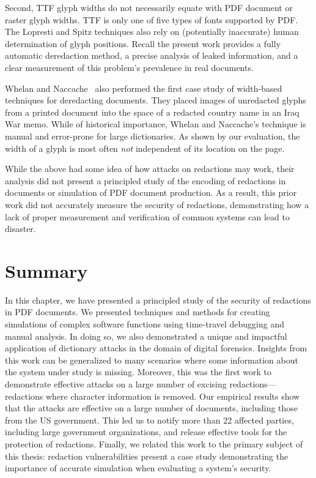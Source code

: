 Second, TTF glyph widths do not necessarily equate with PDF document or raster glyph widths.
TTF is only one of five types of fonts supported by PDF.
The Lopresti and Spitz techniques also rely on (potentially inaccurate) human determination of glyph positions.
Recall the present work provides a fully automatic deredaction method, a precise analysis of leaked information, and a clear measurement of this problem's prevalence in real documents.

Whelan and Naccache~\cite{egyptian} also performed the first case study of width-based techniques for deredacting documents.
They placed images of unredacted glyphs from a printed document into the space of a redacted country name in an Iraq War memo.
While of historical importance, Whelan and Naccache's technique is manual and error-prone for large dictionaries.
As shown by our evaluation, the width of a glyph is most often \emph{not} independent of its location on the page.

While the above had some idea of how attacks on redactions may work, their analysis did not present a principled study of the encoding of redactions in documents or simulation of PDF document production.
As a result, this prior work did not accurately measure the security of redactions, demonstrating how a lack of proper measurement and verification of common systems can lead to disaster.

\section{Summary}

In this chapter, we have presented a principled study of the security of redactions in PDF documents.
We presented techniques and methods for creating simulations of complex software functions using time-travel debugging and manual analysis.
In doing so, we also demonstrated a unique and impactful application of dictionary attacks in the domain of digital forensics.
Insights from this work can be generalized to many scenarios where some information about the system under study is missing.
Moreover, this was the first work to demonstrate effective attacks on a large number of excising redactions---redactions where character information is removed.
Our empirical results show that the attacks are effective on a large number of documents, including those from the US government.
This led us to notify more than 22 affected parties, including large government organizations, and release effective tools for the protection of redactions.
Finally, we related this work to the primary subject of this thesis: redaction vulnerabilities present a case study demonstrating the importance of accurate simulation when evaluating a system's security.


